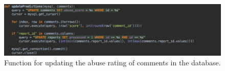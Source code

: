 \begin{figure}[H]
	\centering
	\includegraphics[width=\textwidth]{Images/Implementation/DataProcessing/AbuseDetection/UpdatingScores}
	\caption{Function for updating the abuse rating of comments in the database.}
	\label{fig:AbuseDetection-UpdatePredictions}
\end{figure}